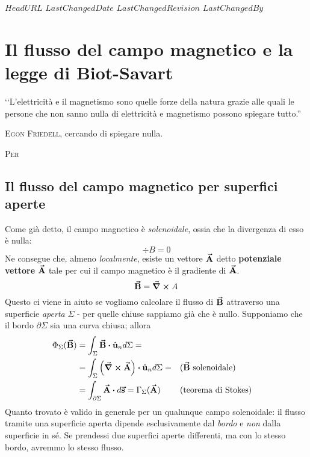 \svnidlong
{$HeadURL$}
{$LastChangedDate$}
{$LastChangedRevision$}
{$LastChangedBy$}

\chapter{Il flusso del campo magnetico e la legge di Biot-Savart}

\begin{introduction}
	‘‘L’elettricità e il magnetismo sono quelle forze della natura grazie alle quali le persone che non sanno nulla di elettricità e magnetismo possono spiegare tutto.''
	\begin{flushright}
		\textsc{Egon Friedell}, cercando di spiegare nulla.
	\end{flushright}
\end{introduction}
\lettrine[findent=1pt, nindent=0pt]{P}{er}  %

\section{Il flusso del campo magnetico per superfici aperte}
Come già detto, il campo magnetico è \textit{solenoidale}, ossia che la divergenza di esso è nulla:
\begin{equation*}
	\div{B}=0
\end{equation*}
Ne consegue che, almeno \textit{localmente}, esiste un vettore $\vb*{\va{A}}$ detto \textbf{potenziale vettore} $\vb*{\va{A}}$ tale per cui il campo magnetico è il gradiente di $\vb*{\va{A}}$.
\begin{equation}
	\vb*{\va{B}}=\curl{A}
\end{equation}
Questo ci viene in aiuto se vogliamo calcolare il flusso di $\vb*{\va{B}}$ attraverso una superficie \textit{aperta} $\Sigma$ - per quelle chiuse sappiamo già che è nullo. Supponiamo che il bordo $\partial \Sigma$ sia una curva chiusa; allora
\begin{align*}
	\Phi_{\Sigma}(\vba{B})&=\int_{\Sigma}\vba{B}\vdot\vbh{u}_nd\Sigma=\\
	&=\int_{\Sigma}\left(\curl{\vba{A}}\right)\vdot\vbh{u}_nd\Sigma=&&\text{(}\vba{B}\ \text{solenoidale)}\\
	&=\int_{\partial \Sigma}\vba{A}\vdot d\vba{s}=\Gamma_{\Sigma}(\vba{A})&&\text{(teorema di Stokes)}
\end{align*}
Quanto trovato è valido in generale per un qualunque campo solenoidale: il flusso tramite una superficie aperta dipende esclusivamente dal \textit{bordo} e \textit{non} dalla superficie in sé. Se prendessi due superfici aperte differenti, ma con lo stesso bordo, avremmo lo stesso flusso.

